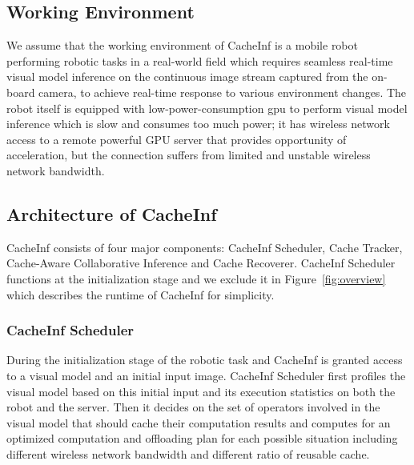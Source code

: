 
\subsection{Working Environment}
We assume that the working environment of CacheInf is a mobile robot performing robotic tasks in a real-world field which requires seamless real-time visual model inference on the continuous image stream captured from the on-board camera, to achieve real-time response to various environment changes.
The robot itself is equipped with low-power-consumption gpu to perform visual model inference which is slow and consumes too much power; it has wireless network access to a remote powerful GPU server that provides opportunity of acceleration, but the connection suffers from limited and unstable wireless network bandwidth.


\subsection{Architecture of CacheInf}
CacheInf consists of four major components: CacheInf Scheduler, Cache Tracker, Cache-Aware Collaborative Inference and Cache Recoverer.
CacheInf Scheduler functions at the initialization stage and we exclude it in Figure~\ref{fig:overview} which describes the runtime of CacheInf for simplicity.

\subsubsection{CacheInf Scheduler}
During the initialization stage of the robotic task and CacheInf is granted access to a visual model and an initial input image.
CacheInf Scheduler first profiles the visual model based on this initial input and its execution statistics on both the robot and the server.
Then it decides on the set of operators involved in the visual model that should cache their computation results and computes for an optimized computation and offloading plan for each possible situation including different wireless network bandwidth and different ratio of reusable cache.

